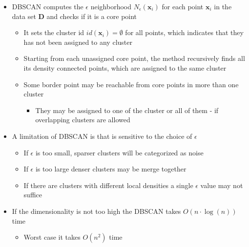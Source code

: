 \documentclass[a4, english]{article}
\begin{document}
\begin{itemize}
  \item DBSCAN computes the $\epsilon$ neighborhood $N_\epsilon(\pmb x_i)$ for each point $\pmb x_i$ in the data set $\mathbf D$ and checks if it is a core point
  \begin{itemize}
  	\item It sets the cluster id $id(\pmb x_i) = \emptyset$ for all points, which indicates that they has not been assigned to any cluster
  	\item Starting from each unassigned core point, the method recursively finds all its density connected points, which are assigned to the same cluster
	  \item Some border point may be reachable from core points in more than one cluster
    \begin{itemize}
    	\item They may be assigned to one of the cluster or all of them - if overlapping clusters are allowed 
    \end{itemize}
  \end{itemize}
  \item A limitation of DBSCAN is that is sensitive to the choice of $\epsilon$
  \begin{itemize}
	  \item If $\epsilon$ is too small, sparser clusters will be categorized as noise
  	\item If $\epsilon$ is too large denser clusters may be merge together
	  \item If there are clusters with different local densities a single $\epsilon$ value may not suffice 
  \end{itemize}
  \item If the dimensionality is not too high the DBSCAN takes $O(n \cdot \log(n))$ time
  \begin{itemize}
	  \item Worst case it takes $O(n^2)$ time
  \end{itemize}
\end{itemize}
\end{document}
